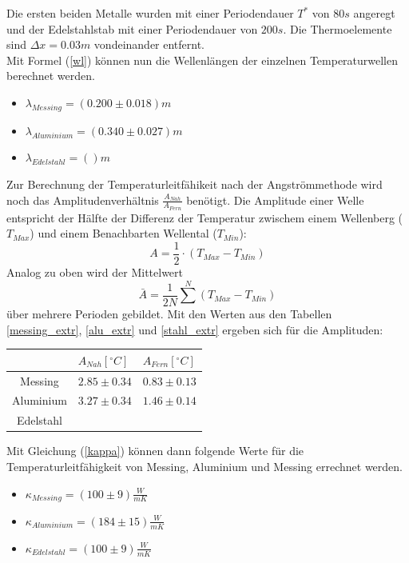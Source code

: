 \documentclass[11pt]{article}
\begin{document}
Die ersten beiden Metalle wurden mit einer Periodendauer $T^*$ von $80s$ angeregt und der Edelstahlstab mit einer Periodendauer von $200s$. Die Thermoelemente sind $\Delta x = 0.03m$ vondeinander entfernt. \\Mit Formel (\ref{wl}) können nun die Wellenlängen der einzelnen Temperaturwellen berechnet werden. 
\begin{itemize}
\item $\lambda_{Messing}=(0.200\pm0.018)m$
\item $\lambda_{Aluminium}=(0.340\pm0.027)m$
\item $\lambda_{Edelstahl}=()m$
\end{itemize}
Zur Berechnung der Temperaturleitfähikeit nach der Angströmmethode wird noch das Amplitudenverhältnis $\frac{A_{Nah}}{A_{Fern}}$ benötigt. Die Amplitude einer Welle entspricht der Hälfte der Differenz der Temperatur zwischem einem Wellenberg ($T_{Max}$) und einem Benachbarten Wellental ($T_{Min}$):
\begin{equation}
A = \frac12\cdot(T_{Max}-T_{Min})
\end{equation}
Analog zu oben wird der Mittelwert
\begin{equation}
\bar {A} = \frac1{2N} \sum^N (T_{Max}-T_{Min})
\end{equation}
über mehrere Perioden gebildet. Mit den Werten aus den Tabellen \ref{messing_extr}, \ref{alu_extr} und \ref{stahl_extr} ergeben sich für die Amplituden:
\begin{table}[H]
\centering
\begin{tabular}{c|l|l}
	& $A_{Nah}[^\circ C]$ & $A_{Fern}[^\circ C]$\\
	\hline
	Messing&$2.85\pm0.34 $& $0.83\pm0.13$ \\
	Aluminium & $3.27\pm0.34$ & $1.46\pm0.14$\\
	Edelstahl & $ $ &   $ $\\
\end{tabular}
\end{table}\noindent
\begin{table}[H]

\end{table}\noindent
Mit Gleichung (\ref{kappa}) können dann folgende Werte für die Temperaturleitfähigkeit von Messing, Aluminium und Messing errechnet werden.
\begin{itemize}
\item $\kappa_{Messing} = (100\pm9)\frac{W}{m K}$
\item $\kappa_{Aluminium} = (184\pm15)\frac{W}{m K}$
\item $\kappa_{Edelstahl} = (100\pm9)\frac{W}{m K}$
\end{itemize}
\end{document}
